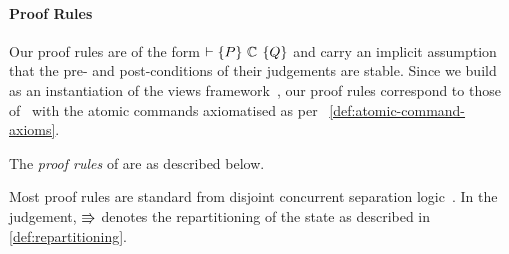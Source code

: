 \paragraph{Proof Rules}
Our proof rules are of the form $\entails \{P\}\ \com\ \{Q\}$ and carry an implicit assumption that the pre- and post-conditions of their judgements are stable. Since we build \colosl as an instantiation of the views framework~\cite{views}, our proof rules correspond to those of~\cite{views} with the atomic commands axiomatised as per ~\ref{def:atomic-command-axioms}. 
%
\begin{definition}
The \emph{proof rules} of \colosl are as described below. 
\begin{mathpar}
%

%	

%

%
	
%	

%
	
%	

\end{mathpar}
\end{definition}
%
Most proof rules are standard from disjoint concurrent separation logic~\cite{csl-tcs}. In the  judgement, $\semimplies$ denotes the repartitioning of the state as described in \ref{def:repartitioning}.
%
%
